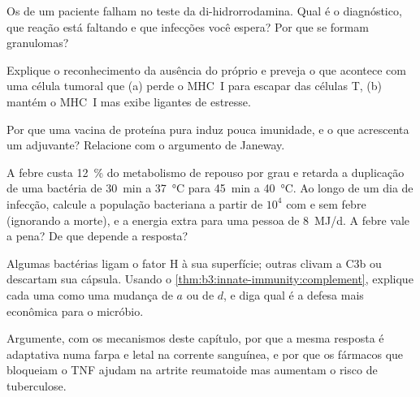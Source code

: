 \begin{exercise}[$\star\star$]\label{exo:b3:innate-immunity:7}
Os  de um paciente falham no teste da di-hidrorrodamina.
Qual é o diagnóstico, que reação está faltando e que infecções você
espera? Por que se formam granulomas?
\end{exercise}

\begin{exercise}[$\star\star$]\label{exo:b3:innate-immunity:8}
Explique o reconhecimento da ausência do próprio e preveja o que
acontece com uma célula tumoral que (a) perde o MHC~I para escapar das
células T, (b) mantém o MHC~I mas exibe ligantes de estresse.
\end{exercise}

\begin{exercise}[$\star\star$]\label{exo:b3:innate-immunity:9}
Por que uma vacina de proteína pura induz pouca imunidade, e o que
acrescenta um adjuvante? Relacione com o argumento de Janeway.
\end{exercise}

\begin{exercise}[$\star\star\star$]\label{exo:b3:innate-immunity:10}
A febre custa \qty{12}{\%} do metabolismo de repouso por grau e retarda
a duplicação de uma bactéria de \qty{30}{min} a \qty{37}{\celsius} para
\qty{45}{min} a \qty{40}{\celsius}. Ao longo de um dia de infecção,
calcule a população bacteriana a partir de $10^{4}$ com e sem febre
(ignorando a morte), e a energia extra para uma pessoa de
\qty{8}{MJ/d}. A febre vale a pena? De que depende a resposta?
\end{exercise}

\begin{exercise}[$\star\star\star$]\label{exo:b3:innate-immunity:11}
Algumas bactérias ligam o fator H à sua superfície; outras clivam a C3b
ou descartam sua cápsula. Usando o \cref{thm:b3:innate-immunity:complement},
explique cada uma como uma mudança de $a$ ou de $d$, e diga qual é a
defesa mais econômica para o micróbio.
\end{exercise}

\begin{exercise}[$\star\star\star$]\label{exo:b3:innate-immunity:12}
Argumente, com os mecanismos deste capítulo, por que a mesma resposta é
adaptativa numa farpa e letal na corrente sanguínea, e por que os
fármacos que bloqueiam o TNF ajudam na artrite reumatoide mas aumentam
o risco de tuberculose.
\end{exercise}

